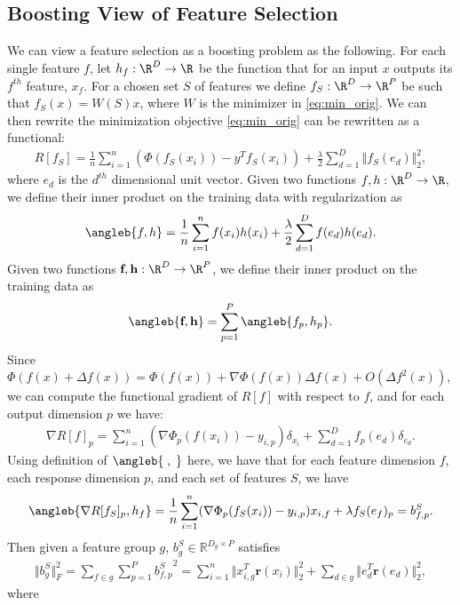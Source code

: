 \subsection{Boosting View of Feature Selection}
We can view a feature selection as a boosting problem as the following. 
For each single feature $f$, let $h_f : \R^D \rightarrow \R$ be the function that for 
an input $x$ outputs its $f^{th}$ feature, $x_f$. 
For a chosen set $S$ of features we 
define $f_S: \R^D \rightarrow \R^P$ be such that 
$f_S(x) = W(S)x$, where $W$ is the minimizer in \ref{eq:min_orig}. 
We can then rewrite the minimization objective \ref{eq:min_orig}
can be rewritten as a functional:
\begin{align}
  R[f_S] = \frac{1}{n} \sum _{i=1}^n (\Phi(f_S(x_i)) - y^Tf_S(x_i)) 
    + \frac{\lambda}{2} \sum _{d = 1}^D \Vert f_S(e_d) \Vert _2^2,
  \label{min_func}
\end{align}
where $e_d$ is the $d^{th}$ dimensional unit vector.
Given two functions $f, h : \R^D \rightarrow \R$, we define their inner product 
on the training data with regularization as 
\begin{align}
\angleb{f, h} = \frac{1}{n} 
  \sum _{i=1}^n f(x_i)h(x_i) + \frac{\lambda}{2} \sum _{d=1}^D f(e_d)h(e_d).
\end{align}
Given two functions $\textbf{f}, \textbf{h}: \R^D \rightarrow \R^P$, 
we define their inner product on the training data as 
\begin{align}
  \angleb{\textbf{f}, \textbf{h}} = \sum _{p=1}^P \angleb{f_p, h_p}.
\end{align}
Since $\Phi(f(x) + \Delta f(x)) = \Phi(f(x)) + \nabla\Phi(f(x))\Delta f(x) + 
O(\Delta f^2(x))$,
we can compute the functional gradient of $R[f]$
with respect to $f$, and for each output dimension $p$ we have:
\begin{align}
  \nabla R[f]_p = \sum_{i=1}^n (\nabla\Phi_p(f(x_i)) - y_{i,p})\delta_{x_i} 
    + \sum _{d=1}^D f_p(e_d)\delta_{e_d}.
\end{align}
Using definition of $\angleb{\;,\;}$ here, we have that
for each feature dimension $f$, each response dimension $p$, 
  and each set of features $S$, we have  
\begin{align}
  \angleb{\nabla R[f_S]_p , h_f} = 
    \frac{1}{n}\sum_{i=1}^n (\nabla\Phi_p(f_S(x_i)) - y_{i,p})x_{i,f}
    + \lambda f_S(e_f)_p = b_{f,p}^S. 
\end{align}
Then given a feature group $g$, $b_{g}^S \in \mathbb{R}^{D_g \times P}$ satisfies 
\begin{align}
  \Vert b_{g}^S \Vert _F^2 = \sum _{f \in g} \sum _{p=1}^P {b_{f,p}^S}^2 = 
    \sum _{i=1}^n \Vert x_{i,g}^T\textbf{r}(x_{i}) \Vert _2^2  + \sum _{d \in g} \Vert e_d^T\textbf{r}(e_d) \Vert _2^2,
\end{align} where
